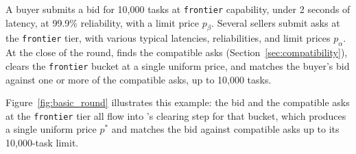 \begin{example}
\label{ex:basic_round}
A buyer submits a bid for 10,000 tasks at \texttt{frontier} capability,
under 2 seconds of latency, at 99.9\% reliability, with a limit price
$p_\beta$. Several sellers submit asks at the \texttt{frontier} tier, with
various typical latencies, reliabilities, and limit prices $p_\alpha$. At
the close of the round, \NoesisMarket{} finds the compatible asks
(Section~\ref{sec:compatibility}), clears the \texttt{frontier} bucket at a
single uniform price, and matches the buyer's bid against one or more of
the compatible asks, up to 10,000 tasks.
\end{example}

Figure~\ref{fig:basic_round} illustrates this example: the bid and the
compatible asks at the \texttt{frontier} tier all flow into \NoesisMarket's
clearing step for that bucket, which produces a single uniform price $p^*$ and
matches the bid against compatible asks up to its 10,000-task limit.

